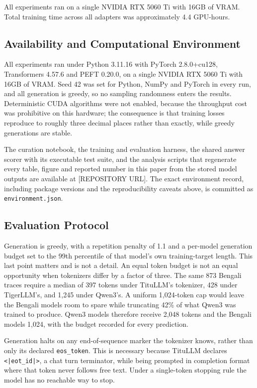 \documentclass[10pt,twocolumn,letterpaper]{article}
\begin{document}
All experiments ran on a single NVIDIA RTX 5060 Ti with 16GB of VRAM. Total
training time across all adapters was approximately 4.4 GPU-hours.

\subsection{Availability and Computational Environment}

All experiments ran under Python 3.11.16 with PyTorch 2.8.0+cu128,
Transformers 4.57.6 and PEFT 0.20.0, on a single NVIDIA RTX 5060 Ti with 16GB
of VRAM. Seed 42 was set for Python, NumPy and PyTorch in every run, and all
generation is greedy, so no sampling randomness enters the results.
Deterministic CUDA algorithms were not enabled, because the throughput cost was
prohibitive on this hardware; the consequence is that training losses reproduce
to roughly three decimal places rather than exactly, while greedy generations
are stable.

The curation notebook, the training and evaluation harness, the shared answer
scorer with its executable test suite, and the analysis scripts that regenerate
every table, figure and reported number in this paper from the stored model
outputs are available at [REPOSITORY URL]. The exact environment record,
including package versions and the reproducibility caveats above, is committed
as \texttt{environment.json}.

\subsection{Evaluation Protocol}

Generation is greedy, with a repetition penalty of 1.1 and a per-model
generation budget set to the 99th percentile of that model's own training-target
length. This last point matters and is not a detail. An equal token budget is
not an equal opportunity when tokenizers differ by a factor of three. The same
873 Bengali traces require a median of 397 tokens under TituLLM's tokenizer, 428
under TigerLLM's, and 1,245 under Qwen3's. A uniform 1,024-token cap would leave
the Bengali models room to spare while truncating 42\% of what Qwen3 was trained
to produce. Qwen3 models therefore receive 2,048 tokens and the Bengali models
1,024, with the budget recorded for every prediction.

Generation halts on any end-of-sequence marker the tokenizer knows, rather than
only its declared \texttt{eos\_token}. This is necessary because TituLLM
declares \texttt{<|eot\_id|>}, a chat turn terminator, while being prompted in
completion format where that token never follows free text. Under a
single-token stopping rule the model has no reachable way to stop.
\end{document}
